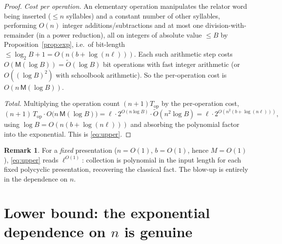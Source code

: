 \documentclass{amsart}
\theoremstyle{definition}
\newtheorem{remark}{Remark}
\begin{document}
\begin{proof}
\emph{Cost per operation.} An elementary operation manipulates the relator word being inserted
($\le n$ syllables) and a constant number of other syllables, performing $O(n)$ integer
additions/subtractions and at most one division-with-remainder (in a power reduction), all on
integers of absolute value $\le B$ by Proposition~\ref{prop:exp}, i.e.\ of bit-length $\le
\log_2 B+1=O(n(b+\log(n\ell)))$. Each such arithmetic step costs $O(\mathsf M(\log B))=
\widetilde O(\log B)$ bit operations with fast integer arithmetic (or $O((\log B)^2)$ with
schoolbook arithmetic). So the per-operation cost is $O(n\,\mathsf M(\log B))$.

\emph{Total.} Multiplying the operation count $(n+1)T_{\mathrm{op}}$ by the per-operation cost,
\[
(n+1)\,T_{\mathrm{op}}\cdot O\!\bigl(n\,\mathsf M(\log B)\bigr)
=\ell\cdot 2^{O(n\log B)}\cdot \widetilde O(n^2\log B)
=\ell\cdot 2^{O(n^2(b+\log(n\ell)))},
\]
using $\log B=O(n(b+\log(n\ell)))$ and absorbing the polynomial factor into the exponential.
This is \eqref{eq:upper}.
\end{proof}

\begin{remark}
For a \emph{fixed} presentation ($n=O(1)$, $b=O(1)$, hence $M=O(1)$), \eqref{eq:upper} reads
$\ell^{O(1)}$: collection is polynomial in the input length for each fixed polycyclic
presentation, recovering the classical fact. The blow-up is entirely in the dependence on $n$.
\end{remark}

\section{Lower bound: the exponential dependence on $n$ is genuine}\label{sec:lower}
\end{document}

